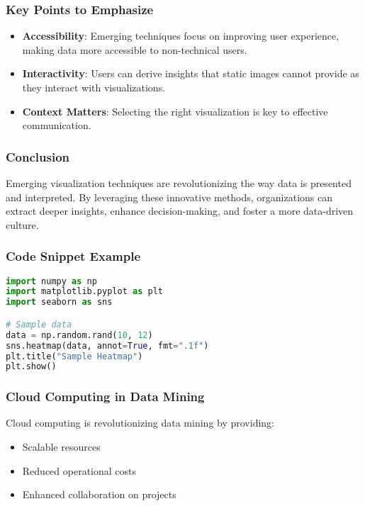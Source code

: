 \documentclass{beamer}
\begin{document}
\begin{frame}[fragile]
    \frametitle{Key Points to Emphasize}
    \begin{itemize}
        \item \textbf{Accessibility}: Emerging techniques focus on improving user experience, making data more accessible to non-technical users.
        \item \textbf{Interactivity}: Users can derive insights that static images cannot provide as they interact with visualizations.
        \item \textbf{Context Matters}: Selecting the right visualization is key to effective communication.
    \end{itemize}
\end{frame}

\begin{frame}[fragile]
    \frametitle{Conclusion}
    Emerging visualization techniques are revolutionizing the way data is presented and interpreted. By leveraging these innovative methods, organizations can extract deeper insights, enhance decision-making, and foster a more data-driven culture.
\end{frame}

\begin{frame}[fragile]
    \frametitle{Code Snippet Example}
    \begin{lstlisting}[language=Python]
import numpy as np
import matplotlib.pyplot as plt
import seaborn as sns

# Sample data
data = np.random.rand(10, 12)
sns.heatmap(data, annot=True, fmt=".1f")
plt.title("Sample Heatmap")
plt.show()
    \end{lstlisting}
\end{frame}

\begin{frame}[fragile]
    \frametitle{Cloud Computing in Data Mining}
    Cloud computing is revolutionizing data mining by providing:
    \begin{itemize}
        \item Scalable resources
        \item Reduced operational costs
        \item Enhanced collaboration on projects
    \end{itemize}
\end{frame}
\end{document}
